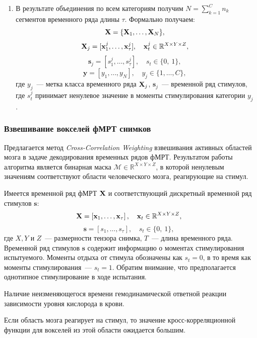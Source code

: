 \begin{enumerate}
	\item В результате объединения по всем категориям получим $N = \sum_{k=1}^C n_k$ сегментов временного ряда длины $\tau$. Формально получаем:
	\begin{equation*} 
		\mathbf{X} = \{\mathbf{X}_1,\dots, \mathbf{X}_{N}\},
	\end{equation*}
	\begin{equation*}
		\mathbf{X}_j = [\mathbf{x}_{1}^j, \ldots, \mathbf{x}_{\tau}^j], \quad
		\mathbf{x}_{t}^j \in \mathbb{R}^{X \times Y \times Z},
	\end{equation*}
	$$\bm{s}_j = \left[s_1^j, \dots, s_{\tau}^j\right], \quad s_t \in \{0,~1\},$$
	$$\bm{y} = \left[y_1, \dots, y_{N}\right],\quad y_j \in \{1,\dots, C\},$$
	где $y_j$~--- метка класса временного ряда $\mathbf{X}_j$, $\bm{s}_j$~--- временной ряд стимулов, где $s_t^j$ принимает ненулевое значение в моменты стимулирования категории $y_j$.
\end{enumerate}


\subsubsection{Взвешивание вокселей фМРТ снимков}
Предлагается метод \textit{Cross-Correlation Weighting} взвешивания активных областей мозга в задаче декодирования временных рядов фМРТ. Результатом работы алгоритма является бинарная маска $\mathcal{M} \in  \mathbb{R}^{X \times Y \times Z}$, в которой ненулевым значениям соответствуют области человеческого мозга, реагирующие на стимул.

Имеется временной ряд фМРТ $\mathbf{X}$ и соответствующий дискретный временной ряд стимулов $\bm{s}$:
\begin{equation*}
\mathbf{X} = \left[\mathbf{x}_{1}, \ldots, \mathbf{x}_{\tau}\right], \quad \mathbf{x}_{t} \in \mathbb{R}^{X \times Y \times Z},
\end{equation*}
\begin{equation*}
\bm{s} = \left[{s}_{1}, \ldots, {s}_{\tau}\right], \quad {s}_{t} \in \{0,~1\},
\end{equation*}
где $X, Y$ и $Z$~--- размерности тензора снимка, $T$~--- длина временного ряда. Временной ряд стимулов $\bm{s}$ содержит информацию о моментах стимулирования испытуемого. Моменты отдыха от стимула обозначены как $s_t = 0$, в то время как моменты стимулирования~--- $s_t = 1$. Обратим внимание, что предполагается однотипное стимулирование в ходе испытания.
\begin{assumption}
        Наличие неизменяющегося времени гемодинамической ответной реакции зависимости уровня кислорода в крови.
     \end{assumption}
        \begin{assumption}
        Если область мозга реагирует на стимул, то значение кросс-корреляционной функции для вокселей из этой области ожидается большим.
    \end{assumption}

